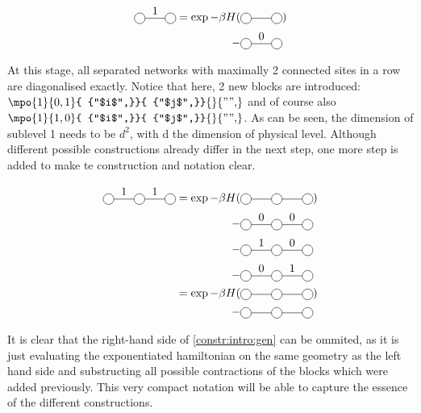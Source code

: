 \begin{equation}
    \begin{split}
        \mpob{2}{ {0,1,0}  }{}{}{}{{"",}}  = \exp -\beta H( & \mpob{2}{ {,,} }{}{}{}{{"",}})  \\
        - &\mpob{2}{ {0,0,0}  }{}{}{}{{"",}}
    \end{split}
\end{equation}

At this stage, all separated networks with maximally 2 connected sites in a row are diagonalised exactly. Notice that here, 2  new blocks are introduced: $\mpo{1}{ {0,1}  }{ {"$i$",}}{ {"$j$",}}{}{{"",}}$ and of course also $\mpo{1}{ {1,0}}{ {"$i$",}}{ {"$j$",}}{}{{"",}}$. As can be seen, the dimension of sublevel 1 needs to be $d^2$, with d the dimension of physical level. Although different possible constructions already differ in the next step, one more step is added to make te construction and notation clear.

\begin{equation}\label{constr:intro:gen}
    \begin{split}
        \mpob{3}{ {0,1,1,0}  }{}{}{}{{,,,}}  = \exp  -\beta H( &\mpob{3}{ {,,,} }{}{}{}{{,,}})  \\
        -&\mpob{3}{ {0,0,0,0}  }{}{}{}{{,,,}}\\
        -&\mpob{3}{ {0,1,0,0}  }{}{}{}{{,,,}}\\
        -&\mpob{3}{ {0,0,1,0}  }{}{}{}{{,,,}}\\
        =\exp  -\beta H( &\mpob{3}{ {,,,} }{}{}{}{{,,}})\\
        -&\mpob{3}{ {,,,}  }{}{}{}{{,,,}}\\
    \end{split}
\end{equation}

It is clear that the right-hand side of \cref{constr:intro:gen} can be ommited, as it is just evaluating the exponentiated hamiltonian on the same geometry as the left hand side and substructing all possible contractions of the blocks which were added previously. This very compact notation will be able to capture the essence of the different constructions.
